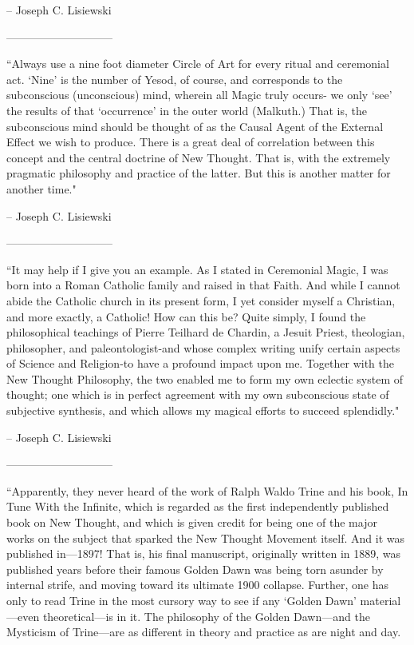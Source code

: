 \begin{footnotesize}
\begin{sffamily}
– Joseph C. Lisiewski

—————————–

``Always use a nine foot diameter Circle of Art for every ritual and ceremonial act. `Nine' is the number of Yesod, of course, and corresponds to the subconscious (unconscious) mind, wherein all Magic truly occurs- we only `see' the results of that `occurrence' in the outer world (Malkuth.) That is, the subconscious mind should be thought of as the Causal Agent of the External Effect we wish to produce. There is a great deal of correlation between this concept and the central doctrine of New Thought. That is, with the extremely pragmatic philosophy and practice of the latter. But this is another matter for another time."

– Joseph C. Lisiewski

—————————–

``It may help if I give you an example. As I stated in Ceremonial Magic, I was born into a Roman Catholic family and raised in that Faith. And while I cannot abide the Catholic church in its present form, I yet consider myself a Christian, and more exactly, a Catholic! How can this be? Quite simply, I found the philosophical teachings of Pierre Teilhard de Chardin, a Jesuit Priest, theologian, philosopher, and paleontologist-and whose complex writing unify certain aspects of Science and Religion-to have a profound impact upon me. Together with the New Thought Philosophy, the two enabled me to form my own eclectic system of thought; one which is in perfect agreement with my own subconscious state of subjective synthesis, and which allows my magical efforts to succeed splendidly."

– Joseph C. Lisiewski

—————————–

``Apparently, they never heard of the work of Ralph Waldo Trine and his book, In Tune With the Infinite, which is regarded as the first independently published book on New Thought, and which is given credit for being one of the major works on the subject that sparked the New Thought Movement itself. And it was published in—1897! That is, his final manuscript, originally written in 1889, was published years before their famous Golden Dawn was being torn asunder by internal strife, and moving toward its ultimate 1900 collapse. Further, one has only to read Trine in the most cursory way to see if any `Golden Dawn' material—even theoretical—is in it. The philosophy of the Golden Dawn—and the Mysticism of Trine—are as different in theory and practice as are night and day.


\end{sffamily}
\end{footnotesize}
